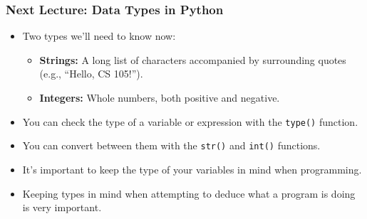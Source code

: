 \documentclass{beamer}
\begin{document}
%
%
\begin{frame}
  \frametitle{Next Lecture: Data Types in Python}
  \begin{itemize}
    \item Two types we'll need to know now:
      \begin{itemize}
        \item \textbf{Strings: } A long list of characters accompanied by surrounding quotes (e.g., ``Hello, CS 105!'').
        \item \textbf{Integers: } Whole numbers, both positive and negative.
      \end{itemize}
    \item You can check the type of a variable or expression with the \lstinline{type()} function.
    \item You can convert between them with the \lstinline{str()} and \lstinline{int()} functions.
    \item It's important to keep the type of your variables in mind when programming.
    \item Keeping types in mind when attempting to deduce what a program is doing is very important. 
  \end{itemize}
\end{frame}
\end{document}
